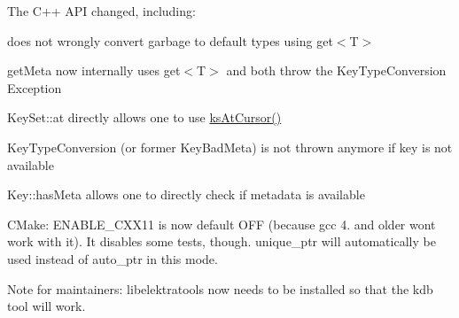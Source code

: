 The C++ A\+PI changed, including\+:


\begin{DoxyItemize}
\item does not wrongly convert garbage to default types using {\ttfamily get$<$T$>$}
\item get\+Meta now internally uses {\ttfamily get$<$T$>$} and both throw the Key\+Type\+Conversion Exception
\item Key\+Set\+::at directly allows one to use \mbox{\hyperlink{group__keyset_ga3604cc41505f7e19db945cece67190b6}{ks\+At\+Cursor()}}
\item Key\+Type\+Conversion (or former Key\+Bad\+Meta) is not thrown anymore if key is not available
\item Key\+::has\+Meta allows one to directly check if metadata is available
\end{DoxyItemize}

C\+Make\+: E\+N\+A\+B\+L\+E\+\_\+\+C\+X\+X11 is now default O\+FF (because gcc 4. and older won\textquotesingle{}t work with it). It disables some tests, though. {\ttfamily unique\+\_\+ptr} will automatically be used instead of {\ttfamily auto\+\_\+ptr} in this mode.

Note for maintainers\+: libelektratools now needs to be installed so that the kdb tool will work.

